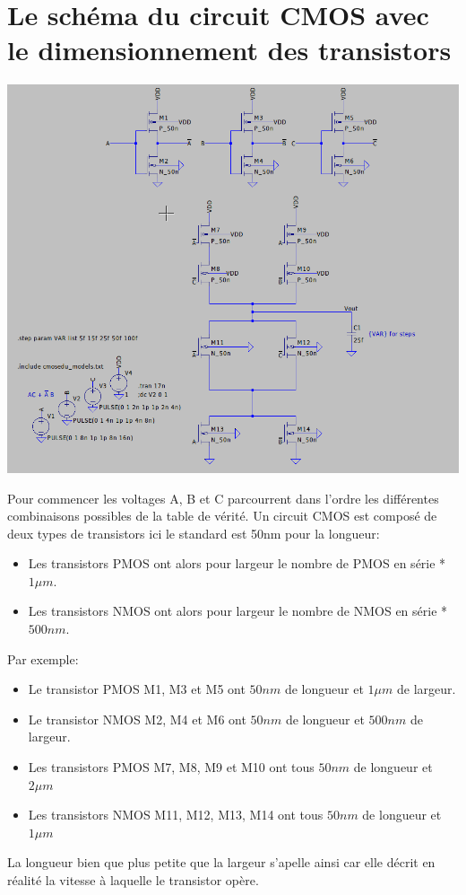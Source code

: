 \documentclass{homeworg}
\begin{document}
\section{Le schéma du circuit CMOS avec le dimensionnement des transistors}
    \begin{center}
        \includegraphics[scale=0.6]{circuit.png}\\
    \end{center}
    Pour commencer les voltages A, B et C parcourrent dans l'ordre les différentes combinaisons possibles de la table de vérité. Un circuit CMOS est composé de deux types de transistors ici le standard est 50nm pour la longueur:
    \begin{itemize}
        \item Les transistors PMOS ont alors pour largeur le nombre de PMOS en série * $1\mu m$.
        \item Les transistors NMOS ont alors pour largeur le nombre de NMOS en série * $500nm$.
    \end{itemize}
    
     Par exemple:
     \begin{itemize}
         \item Le transistor PMOS M1, M3 et M5 ont $50nm$ de longueur et $1\mu m$ de largeur.
         \item Le transistor NMOS M2, M4 et M6 ont $50nm$ de longueur et $500nm$ de largeur.
         \item Les transistors PMOS M7, M8, M9 et M10 ont tous $50nm$ de longueur et $2\mu m$
         \item Les transistors NMOS M11, M12, M13, M14 ont tous $50nm$ de longueur et $1\mu m$
     \end{itemize}
     La longueur bien que plus petite que la largeur s'apelle ainsi car elle décrit en réalité la vitesse à laquelle le transistor opère.
     \newpage
     
\end{document}
